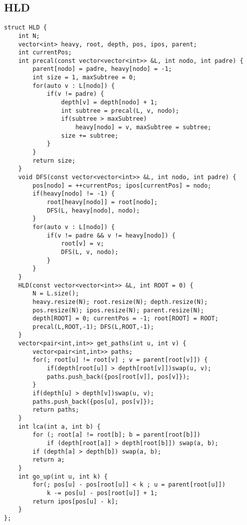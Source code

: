 \documentclass[landscape, 8pt, a4paper, oneside]{extarticle}
\begin{document}
\begin{multicols}{3}
\subsection{HLD}
\begin{verbatim}
struct HLD {
    int N;
    vector<int> heavy, root, depth, pos, ipos, parent;
    int currentPos;
    int precal(const vector<vector<int>> &L, int nodo, int padre) {
        parent[nodo] = padre, heavy[nodo] = -1;
        int size = 1, maxSubtree = 0;
        for(auto v : L[nodo]) {
            if(v != padre) {
                depth[v] = depth[nodo] + 1;
                int subtree = precal(L, v, nodo);
                if(subtree > maxSubtree)
                    heavy[nodo] = v, maxSubtree = subtree;
                size += subtree;
            }
        }
        return size;
    }
    void DFS(const vector<vector<int>> &L, int nodo, int padre) {
        pos[nodo] = ++currentPos; ipos[currentPos] = nodo;
        if(heavy[nodo] != -1) {
            root[heavy[nodo]] = root[nodo];
            DFS(L, heavy[nodo], nodo);
        }
        for(auto v : L[nodo]) {
            if(v != padre && v != heavy[nodo]) {
                root[v] = v;
                DFS(L, v, nodo);
            }
        }
    }
    HLD(const vector<vector<int>> &L, int ROOT = 0) {
        N = L.size();
        heavy.resize(N); root.resize(N); depth.resize(N);
        pos.resize(N); ipos.resize(N); parent.resize(N);
        depth[ROOT] = 0; currentPos = -1; root[ROOT] = ROOT;
        precal(L,ROOT,-1); DFS(L,ROOT,-1);
    }
    vector<pair<int,int>> get_paths(int u, int v) {
        vector<pair<int,int>> paths;
        for(; root[u] != root[v] ; v = parent[root[v]]) {
            if(depth[root[u]] > depth[root[v]])swap(u, v);
            paths.push_back({pos[root[v]], pos[v]});
        }
        if(depth[u] > depth[v])swap(u, v);
        paths.push_back({pos[u], pos[v]});
        return paths;
    }
    int lca(int a, int b) {
        for (; root[a] != root[b]; b = parent[root[b]])
            if (depth[root[a]] > depth[root[b]]) swap(a, b);
        if (depth[a] > depth[b]) swap(a, b);
        return a;
    }
    int go_up(int u, int k) {
        for(; pos[u] - pos[root[u]] < k ; u = parent[root[u]])
            k -= pos[u] - pos[root[u]] + 1;
        return ipos[pos[u] - k];
    }
};
\end{verbatim}

\end{multicols}
\end{document}
